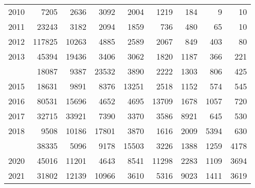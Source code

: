 \documentclass[
]{article}
\begin{document}
\begin{longtable}[t]{lrrrrrrrr}
2010 & 7205 & 2636 & 3092 & 2004 & 1219 & 184 & 9 & 10\\
2011 & 23243 & 3182 & 2094 & 1859 & 736 & 480 & 65 & 10\\
2012 & 117825 & 10263 & 4885 & 2589 & 2067 & 849 & 403 & 80\\
2013 & 45394 & 19436 & 3406 & 3062 & 1820 & 1187 & 366 & 221\\
\addlinespace
2014 & 18087 & 9387 & 23532 & 3890 & 2222 & 1303 & 806 & 425\\
2015 & 18631 & 9891 & 8376 & 13251 & 2518 & 1152 & 574 & 545\\
2016 & 80531 & 15696 & 4652 & 4695 & 13709 & 1678 & 1057 & 720\\
2017 & 32715 & 33921 & 7390 & 3370 & 3586 & 8921 & 645 & 530\\
2018 & 9508 & 10186 & 17801 & 3870 & 1616 & 2009 & 5394 & 630\\
\addlinespace
2019 & 38335 & 5096 & 9178 & 15503 & 3226 & 1388 & 1259 & 4178\\
2020 & 45016 & 11201 & 4643 & 8541 & 11298 & 2283 & 1109 & 3694\\
2021 & 31802 & 12139 & 10966 & 3610 & 5316 & 9023 & 1411 & 3619\\*
\end{longtable}
\end{document}
